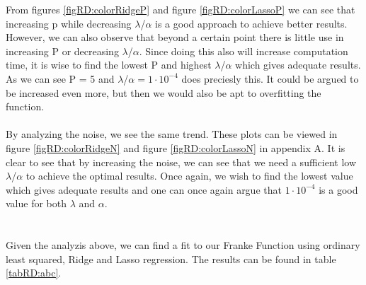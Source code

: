 \documentclass[12pt]{article}
\newcommand{\E}[1]{\cdot 10^{#1}}
\begin{document}
From figures \ref{figRD:colorRidgeP} and figure \ref{figRD:colorLassoP} we can see that increasing p while decreasing $\lambda$/$\alpha$ is a good approach to achieve better results. However, we can also observe that beyond a certain point there is little use in increasing P or decreasing $\lambda$/$\alpha$. Since doing this also will increase computation time, it is wise to find the lowest P and highest $\lambda$/$\alpha$ which gives adequate results. As we can see P = 5 and $\lambda$/$\alpha = 1\E{-4}$ does preciesly this. It could be argued to be increased even more, but then we would also be apt to overfitting the function. \\ \\
By analyzing the noise, we see the same trend. These plots can be viewed in figure \ref{figRD:colorRidgeN} and figure \ref{figRD:colorLassoN} in appendix A. It is clear to see that by increasing the noise, we can see that we need a sufficient low $\lambda$/$\alpha$ to achieve the optimal results. Once again, we wish to find the lowest value which gives adequate results and one can once again argue that $1\E{-4}$ is a good value for both $\lambda$ and $\alpha$. \\ \\ \\
Given the analyzis above, we can find a fit to our Franke Function using ordinary least squared, Ridge and Lasso regression. The results can be found in table \ref{tabRD:abc}.
\end{document}
